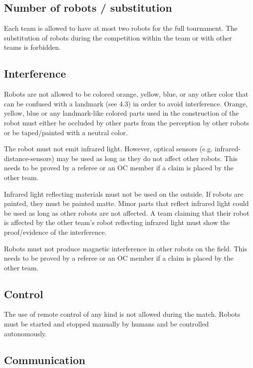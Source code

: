 \documentclass{article}
\begin{document}
\subsection{ Number of robots / substitution \label{ref-019}}

Each team is allowed to have at most two robots for the full tournament. The
substitution of robots during the competition within the team or with other
teams is forbidden.

\subsection{ Interference \label{ref-020}}

Robots are not allowed to be colored orange, yellow, blue, or any other color
that can be confused with a landmark (see 4.3) in order to avoid interference.
Orange, yellow, blue or any landmark-like colored parts used in the
construction of the robot must either be occluded by other parts from the
perception by other robots or be taped/painted with a neutral color.

The robot must not emit infrared light. However, optical sensors (e.g.
infrared-distance-sensors) may be used as long as they do not affect other
robots. This needs to be proved by a referee or an OC member if a claim is
placed by the other team.

Infrared light reflecting materials must not be used on the outside. If robots
are painted, they must be painted matte. Minor parts that reflect infrared
light could be used as long as other robots are not affected. A team claiming
that their robot is affected by the other team's robot reflecting infrared
light must show the proof/evidence of the interference.

Robots must not produce magnetic interference in other robots on the field.
This needs to be proved by a referee or an OC member if a claim is placed by
the other team.

\subsection{ Control \label{ref-021}}

The use of remote control of any kind is not allowed during the match. Robots
must be started and stopped manually by humans and be controlled autonomously.

\subsection{ Communication \label{ref-022}}
\end{document}
